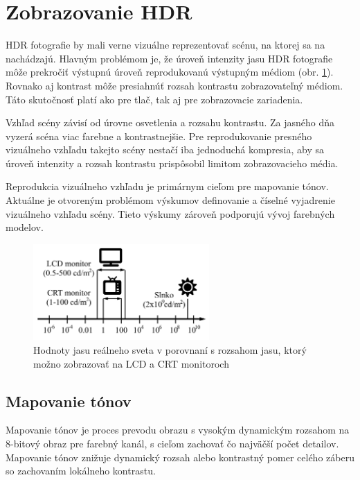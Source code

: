 \section{Zobrazovanie HDR}
\label{sec:Theory-Displaying}

HDR fotografie by mali verne vizuálne reprezentovať scénu, na ktorej sa na nachádzajú. Hlavným problémom
je, že úroveň intenzity jasu HDR fotografie môže prekročiť výstupnú úroveň reprodukovanú výstupným médiom
(obr. \ref{fig:luminance_range}). Rovnako aj kontrast môže presiahnúť rozsah kontrastu zobrazovateľný médiom.
Táto skutočnosť platí ako pre tlač, tak aj pre zobrazovacie zariadenia.

Vzhľad scény závisí od úrovne osvetlenia a rozsahu kontrastu\cite{HDRI}. Za jasného dňa vyzerá scéna viac
farebne a kontrastnejšie. Pre reprodukovanie presného vizuálneho vzhľadu takejto scény nestačí iba jednoduchá
kompresia, aby sa úroveň intenzity a rozsah kontrastu prispôsobil limitom zobrazovacieho média.

Reprodukcia vizuálneho vzhľadu je primárnym cieľom pre mapovanie tónov. Aktuálne je otvoreným problémom
výskumov definovanie a číselné vyjadrenie vizuálneho vzhľadu scény. Tieto výskumy zároveň podporujú vývoj
farebných modelov.

\begin{figure}[t]
    \centering
    \includegraphics[width=0.6\textwidth]{figures/tonemap/monitor_range}
    \caption{Hodnoty jasu reálneho sveta v porovnaní s rozsahom jasu, 
    ktorý možno zobrazovať na LCD a CRT monitoroch \cite{Mantiuk}}
    \label{fig:luminance_range}
\end{figure}

\subsection*{Mapovanie tónov}

Mapovanie tónov je proces prevodu obrazu s vysokým dynamickým rozsahom na 8-bitový obraz pre farebný kanál, 
s cieľom zachovať čo najväčší počet detailov. Mapovanie tónov znižuje dynamický rozsah alebo kontrastný pomer
celého záberu so zachovaním lokálneho kontrastu. \cite{AHDR}

